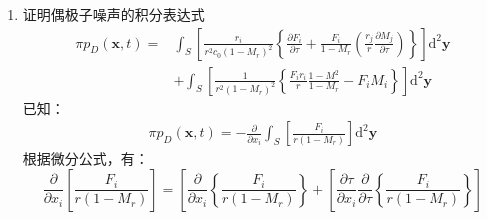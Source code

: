 \begin{enumerate}
    \item 证明偶极子噪声的积分表达式
        \begin{equation*}
            \begin{aligned}
                \pi p_{D}(\mathbf{x}, t)
                =& \int_{S}\left[\frac{r_{i}}{r^{2} c_{0}\left(1-M_{r}\right)^{2}}\left\{\frac{\partial F_{i}}{\partial \tau}+\frac{F_{i}}{1-M_{r}}\left(\frac{r_{j}}{r} \frac{\partial M_{j}}{\partial \tau}\right)\right\}\right] \mathrm{d}^{2} \mathbf{y} \\
                &+\int_{S}\left[\frac{1}{r^{2}\left(1-M_{r}\right)^{2}}\left\{\frac{F_{i} r_{i}}{r} \frac{1-M^{2}}{1-M_{r}}-F_{i} M_{i}\right\}\right] \mathrm{d}^{2} \mathbf{y}
            \end{aligned}
        \end{equation*}
    已知：
    \begin{equation}
        \begin{aligned}
            \pi p_{D}(\mathbf{x}, t)
            = -\frac{\partial}{\partial x_{i}} \int_{S}\left[\frac{F_{i}}{r\left(1-M_{r}\right)}\right] \mathrm{d}^{2} \mathbf{y}
        \end{aligned}
    \end{equation}
    根据微分公式，有：
    \begin{equation}
        \frac{\partial}{\partial x_{i}} \left[\frac{F_{i}}{r\left(1-M_{r}\right)}\right]
        = \left[\frac{\partial}{\partial x_{i}}\left\{\frac{F_{i}}{r\left(1-M_{r}\right)}\right\}+\left[\frac{\partial \tau}{\partial x_{i}}\right.\right.  \left.\frac{\partial}{\partial \tau}\left\{\frac{F_{i}}{r\left(1-M_{r}\right)}\right\}\right]
    \end{equation}

\end{enumerate}